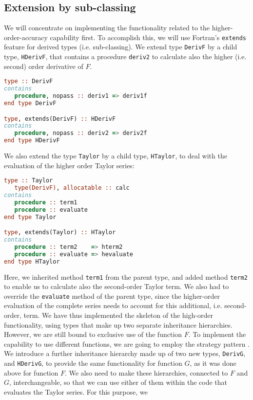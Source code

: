 \documentclass[11pt,oneside]{article}
\begin{document}
\subsection{Extension by sub-classing}
\label{sect:sub-classing-example}

We will concentrate on implementing the functionality related to the
higher-order-accuracy capability first. To accomplish this, we will
use Fortran's \texttt{extends} feature for derived types
(i.e. sub-classing). We extend type \texttt{DerivF} by a child type,
\texttt{HDerivF}, that contains a procedure \texttt{deriv2} to
calculate also the higher (i.e. second) order derivative of $F$.
\begin{lstlisting}[language=Fortran]
type :: DerivF
contains
   procedure, nopass :: deriv1 => deriv1f
end type DerivF

type, extends(DerivF) :: HDerivF
contains
   procedure, nopass :: deriv2 => deriv2f
end type HDerivF
\end{lstlisting}
We also extend the type \texttt{Taylor} by a child type,
\texttt{HTaylor}, to deal with the evaluation of the higher order
Taylor series:
\begin{lstlisting}[language=Fortran]
type :: Taylor
   type(DerivF), allocatable :: calc
contains
   procedure :: term1
   procedure :: evaluate
end type Taylor

type, extends(Taylor) :: HTaylor
contains
   procedure :: term2    => hterm2
   procedure :: evaluate => hevaluate
end type HTaylor
\end{lstlisting}
Here, we inherited method \texttt{term1} from the parent type, and
added method \texttt{term2} to enable us to calculate also the
second-order Taylor term. We also had to override the
\texttt{evaluate} method of the parent type, since the higher-order
evaluation of the complete series needs to account for this
additional, i.e. second-order, term. We have thus implemented the
skeleton of the high-order functionality, using types that make up two
separate inheritance hierarchies. However, we are still bound to
exclusive use of the function $F$. To implement the capability to use
different functions, we are going to employ the strategy pattern
\cite{Gamma_et_al_94}. We introduce a further inheritance hierarchy
made up of two new types, \texttt{DerivG}, and \texttt{HDerivG}, to
provide the same functionality for function $G$, as it was done above
for function $F$. We also need to make these hierarchies, connected to
$F$ and $G$, interchangeable, so that we can use either of them within
the code that evaluates the Taylor series. For this purpose, we
\end{document}
